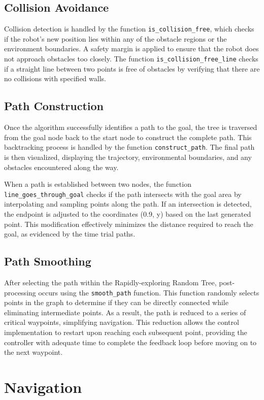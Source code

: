\documentclass[12pt]{article}
\begin{document}
\subsection{Collision Avoidance}
Collision detection is handled by the function \texttt{is\_collision\_free}, which checks if the robot’s new position lies within any of the obstacle regions or the environment boundaries. A safety margin is applied to ensure that the robot does not approach obstacles too closely. The function \texttt{is\_collision\_free\_line} checks if a straight line between two points is free of obstacles by verifying that there are no collisions with specified walls.

\subsection{Path Construction}
Once the algorithm successfully identifies a path to the goal, the tree is traversed from the goal node back to the start node to construct the complete path. This backtracking process is handled by the function \texttt{construct\_path}. The final path is then visualized, displaying the trajectory, environmental boundaries, and any obstacles encountered along the way.

When a path is established between two nodes, the function \texttt{line\_goes\_through\_goal} checks if the path intersects with the goal area by interpolating and sampling points along the path. If an intersection is detected, the endpoint is adjusted to the coordinates (0.9, y) based on the last generated point. This modification effectively minimizes the distance required to reach the goal, as evidenced by the time trial paths.

\subsection{Path Smoothing}
After selecting the path within the Rapidly-exploring Random Tree, post-processing occurs using the \texttt{smooth\_path} function. This function randomly selects points in the graph to determine if they can be directly connected while eliminating intermediate points. As a result, the path is reduced to a series of critical waypoints, simplifying navigation. This reduction allows the control implementation to restart upon reaching each subsequent point, providing the controller with adequate time to complete the feedback loop before moving on to the next waypoint.

\section{Navigation}
\end{document}
